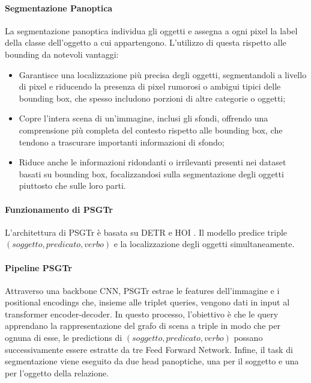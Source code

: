 \paragraph*{Segmentazione Panoptica}
La segmentazione panoptica individua gli oggetti e assegna a ogni pixel la label della classe dell'oggetto a cui appartengono. L'utilizzo di questa rispetto alle bounding da notevoli vantaggi:
\begin{itemize}
  \item Garantisce una localizzazione più precisa degli oggetti, segmentandoli a livello di pixel e riducendo la presenza di pixel rumorosi o ambigui tipici delle bounding box, che spesso includono porzioni di altre categorie o oggetti;
  \item Copre l'intera scena di un'immagine, inclusi gli sfondi, offrendo una comprensione più completa del contesto rispetto alle bounding box, che tendono a trascurare importanti informazioni di sfondo;
  \item Riduce anche le informazioni ridondanti o irrilevanti presenti nei dataset basati su bounding box, focalizzandosi sulla segmentazione degli oggetti piuttosto che sulle loro parti.
\end{itemize}
\paragraph*{Funzionamento di PSGTr}
L'architettura di PSGTr è basata su DETR \cite{detr} e HOI \cite{hoi}. Il modello predice triple $(soggetto, predicato, verbo)$ e la localizzazione degli oggetti simultaneamente.
\paragraph*{Pipeline PSGTr}
Attraverso una \gls{backbone} CNN, PSGTr estrae le features dell'immagine e i positional encodings che, insieme alle triplet queries, vengono dati in input al transformer encoder-decoder. In questo processo, l'obiettivo è che le query apprendano la rappresentazione del grafo di scena a triple in modo che per ognuna di esse, le predictions di  $(soggetto, predicato, verbo)$ possano successivamente essere estratte da tre Feed Forward Network. Infine, il task di segmentazione viene eseguito da due head panoptiche, una per il soggetto e una per l'oggetto della relazione.

